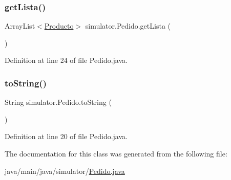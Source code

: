 \subsubsection{\texorpdfstring{get\+Lista()}{getLista()}}
{\footnotesize\ttfamily Array\+List$<$\mbox{\hyperlink{classsimulator_1_1_producto}{Producto}}$>$ simulator.\+Pedido.\+get\+Lista (\begin{DoxyParamCaption}{ }\end{DoxyParamCaption})}



Definition at line 24 of file Pedido.\+java.

\mbox{\label{classsimulator_1_1_pedido_a5519f7e51ab5b3506840f332a7cd1157}} 
\subsubsection{\texorpdfstring{to\+String()}{toString()}}
{\footnotesize\ttfamily String simulator.\+Pedido.\+to\+String (\begin{DoxyParamCaption}{ }\end{DoxyParamCaption})}



Definition at line 20 of file Pedido.\+java.



The documentation for this class was generated from the following file\+:\begin{DoxyCompactItemize}
\item 
java/main/java/simulator/\mbox{\hyperlink{_pedido_8java}{Pedido.\+java}}\end{DoxyCompactItemize}

